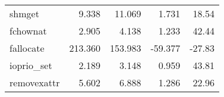 \begin{tabular}{>{\ttfamily}lrrrr}
                         shmget &                    9.338 &                   11.069 &          1.731 &       18.54 \\
                       fchownat &                    2.905 &                    4.138 &          1.233 &       42.44 \\
                      fallocate &                  213.360 &                  153.983 &        -59.377 &      -27.83 \\
                    ioprio\_set &                    2.189 &                    3.148 &          0.959 &       43.81 \\
                    removexattr &                    5.602 &                    6.888 &          1.286 &       22.96 \\
\bottomrule
\end{tabular}
